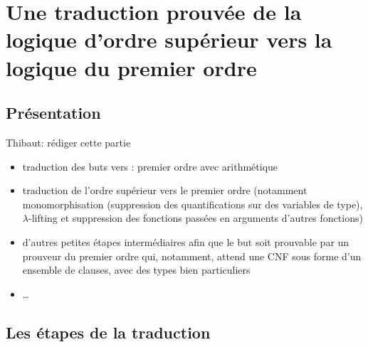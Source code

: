 \section{Une traduction prouvée de la logique d'ordre supérieur vers la
  logique du premier ordre}
\label{sec:traduction}

\subsection{Présentation}

\todo Thibaut: rédiger cette partie
\begin{itemize}
\item traduction des buts \holfour vers \tff : premier ordre avec
  arithmétique
\item traduction de l'ordre supérieur vers le premier ordre (notamment
  monomorphisation (suppression des quantifications sur des variables de
  type), $\lambda$-lifting et suppression des fonctions passées en
  arguments d'autres fonctions)
\item d'autres petites étapes intermédiaires afin que le but soit
  prouvable par un prouveur du premier ordre qui, notamment, attend une
  CNF sous forme d'un ensemble de clauses, avec des types bien
  particuliers
\item \dots
\end{itemize}


\subsection{Les étapes de la traduction}

